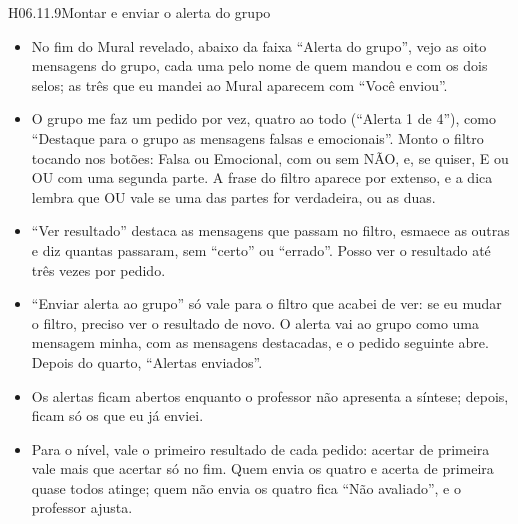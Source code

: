\begin{historia}{H06.11.9}{Montar e enviar o alerta do grupo}{\parcial}
\aceite
\begin{itemize}
  \item No fim do Mural revelado, abaixo da faixa \enquote{Alerta do grupo},
    vejo as oito mensagens do grupo, cada uma pelo nome de quem mandou e com os
    dois selos; as três que eu mandei ao Mural aparecem com \enquote{Você
    enviou}.
  \item O grupo me faz um pedido por vez, quatro ao todo (\enquote{Alerta 1 de
    4}), como \enquote{Destaque para o grupo as mensagens falsas e
    emocionais}. Monto o filtro tocando nos botões: Falsa ou Emocional, com
    ou sem NÃO, e, se quiser, E ou OU com uma segunda parte. A frase do
    filtro aparece por extenso, e a dica lembra que OU vale se uma das partes
    for verdadeira, ou as duas.
  \item \enquote{Ver resultado} destaca as mensagens que passam no filtro,
    esmaece as outras e diz quantas passaram, sem \enquote{certo} ou
    \enquote{errado}. Posso ver o resultado até três vezes por pedido.
  \item \enquote{Enviar alerta ao grupo} só vale para o filtro que acabei de
    ver: se eu mudar o filtro, preciso ver o resultado de novo. O alerta vai
    ao grupo como uma mensagem minha, com as mensagens destacadas, e o pedido
    seguinte abre. Depois do quarto, \enquote{Alertas enviados}.
  \item Os alertas ficam abertos enquanto o professor não apresenta a
    síntese; depois, ficam só os que eu já enviei.
  \item Para o nível, vale o primeiro resultado de cada pedido: acertar de
    primeira vale mais que acertar só no fim. Quem envia os quatro e acerta
    de primeira quase todos atinge; quem não envia os quatro fica
    \enquote{Não avaliado}, e o professor ajusta.
\end{itemize}
\end{historia}

